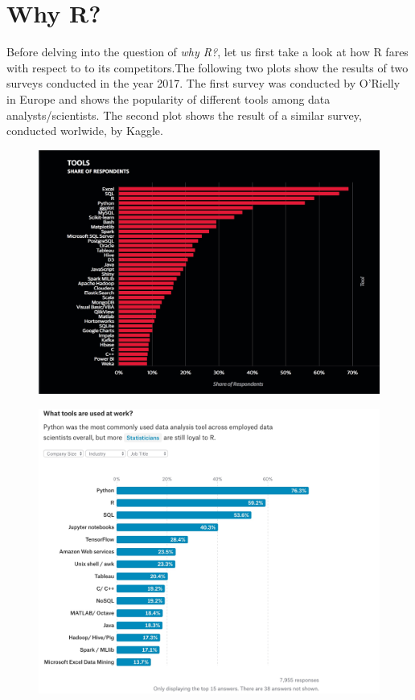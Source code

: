 \newpage
\section{Why R?}
\noindent Before delving into the question of \emph{why R?}, let us first take a look at how R fares with respect to to its competitors.The following two plots show the results of two surveys conducted in the year 2017. The first survey was conducted by O'Rielly in Europe and shows the popularity of different tools among data analysts/scientists. The second plot shows the result of a similar survey, conducted worlwide, by Kaggle. 
    \begin{figure}[ht] %
      \centering
      \includegraphics[width = 10 cm]{./viz/ext/OR_DS_Tools_Survey.jpeg}
    \end{figure}
    \begin{figure}[ht] %
      \centering
      \includegraphics[width = 10 cm]{./viz/ext/Kaggle_DS_Tools_Survey.jpeg}
    \end{figure}

